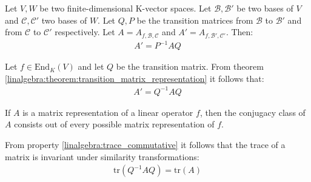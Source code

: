 	\begin{theorem}\label{linalgebra:theorem:transition_matrix_representation}
        	Let $V,W$ be two finite-dimensional K-vector spaces. Let $\mathcal{B}, \mathcal{B}'$ be two bases of $V$ and $\mathcal{C}, \mathcal{C}'$ two bases of $W$. Let $Q, P$ be the transition matrices from $\mathcal{B}$ to $\mathcal{B}'$ and from $\mathcal{C}$ to $\mathcal{C}'$ respectively. Let $A=A_{f, \mathcal{B}, \mathcal{C}}$ and $A' = A_{f, \mathcal{B}', \mathcal{C}'}$. Then:
	        \begin{gather}
        	    	A' = P^{-1}AQ
        	\end{gather}
	\end{theorem}
        \begin{result}
		Let $f\in \text{End}_K(V)$ and let $Q$ be the transition matrix. From theorem \ref{linalgebra:theorem:transition_matrix_representation} it follows that:
            	\begin{gather}
	            	A'=Q^{-1}AQ
        	\end{gather}
	\end{result}

        \begin{remark}
        	If $A$ is a matrix representation of a linear operator $f$, then the conjugacy class of $A$ consists out of every possible matrix representation of $f$.
        \end{remark}
        
        \begin{property}
        	From property \ref{linalgebra:trace_commutative} it follows that the trace of a matrix is invariant under similarity transformations:
        	\begin{gather}
            		\label{linalgebra:trace_invariance}
            		\boxed{\text{tr}(Q^{-1}AQ) = \text{tr}(A)}
	        \end{gather}
        \end{property}
        
